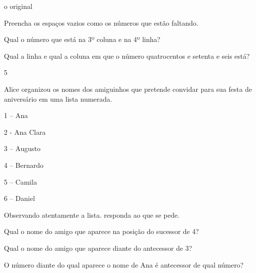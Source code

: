 \begin{escolha}
\Consultar o original

\begin{escolha}
\item
  Preencha os espaços vazios como os números que estão faltando.

\item
  Qual o número que está na 3º coluna e na 4º linha?


\item
  Qual a linha e qual a coluna em que o número quatrocentos e setenta e seis está?

\end{escolha}

\num{5}

Alice organizou os nomes dos amiguinhos que pretende convidar para sua
festa de aniversário em uma lista numerada.


1 -- Ana

2 - Ana Clara

3 -- Augusto

4 -- Bernardo

5 -- Camila

6 -- Daniel

Observando atentamente a lista. responda ao que se pede.

\begin{escolha}

\item
  Qual o nome do amigo que aparece na posição do sucessor de 4?

\item
  Qual o nome do amigo que aparece diante do antecessor de 3?

\item
  O número diante do qual aparece o nome de Ana é antecessor de qual número?

\end{escolha}


\end{escolha}
